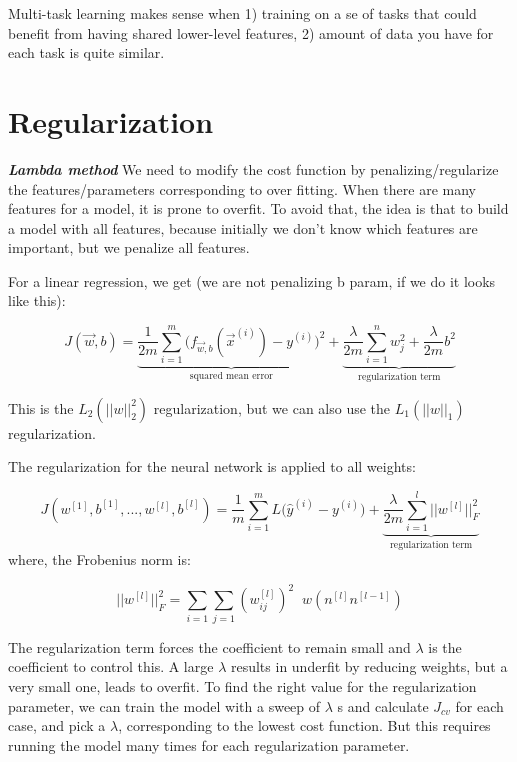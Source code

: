 \documentclass[12pt]{report}
\begin{document}
Multi-task learning makes sense when 1) training on a se of tasks that could benefit from having shared lower-level features, 2) amount of data you have for each task is quite similar.




\section{Regularization}
\label{sec:regularization}


\textbf{\textit{Lambda method}}
We need to modify the cost function by penalizing/regularize the features/parameters corresponding to over fitting. When there are many features for a model, it is prone to overfit. To avoid that, the idea is that to build a model with all features, because initially we don't know which features are important, but we penalize all features.

For a linear regression, we get (we are not penalizing b param, if we do it looks like this):

\begin{equation}
J(\overrightarrow{w},b) = \underbrace{  \frac{1}{2m} \sum_{i=1}^{m} \big( f_{\overrightarrow{w},b} (\overrightarrow{x}^{(i)}) - y^{(i)} \big) ^2}_\text{squared mean error} + \underbrace{ \frac{\lambda}{2m} \sum_{i=1}^n w_j^2 + \frac{\lambda}{2m} b^2}_\text{regularization term}
\end{equation}

This is the $L_2 (||w||^2_2) $ regularization, but we can also use the $L_1 (||w||_1)$ regularization.


The regularization for the neural network is applied to all weights:

\begin{equation}
  J(w^{[1]},b^{[1]}, ... , w^{[l]},b^{[l]}) = \frac{1}{m} \sum_{i=1}^{m} L \big( \hat{y}^{(i)} - y^{(i)} \big)+ \underbrace{ \frac{\lambda}{2m} \sum_{i=1}^l ||w^{[l]}||_F^2 }_\text{regularization term}
\end{equation}
where, the Frobenius norm is:

\begin{equation}
 ||w^{[l]}||_F^2 = \sum_{i=1}\sum_{j=1} (w_{ij}^{[l]})^2 \; \; w (n^{[l]} n^{[l-1]} )
\end{equation}


The regularization term forces the coefficient to remain small and $\lambda$ is the coefficient to control this. A large $\lambda$ results in underfit by reducing weights, but a very small one, leads to overfit. To find the right value for the regularization parameter, we can train the model with a sweep of $\lambda$ s and calculate $J_{cv}$ for each case, and pick a $\lambda$, corresponding to the lowest cost function. But this requires running the model many times for each regularization parameter.
\end{document}
